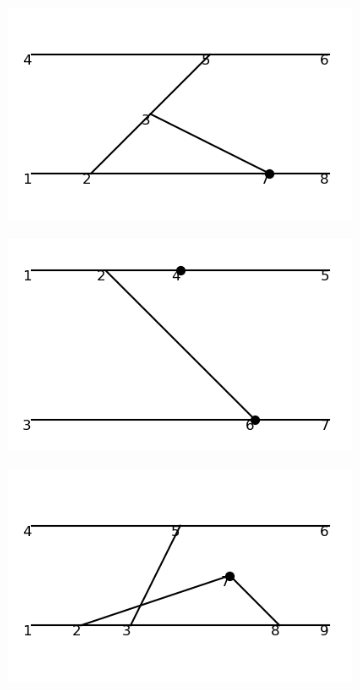 \documentclass[11pt,a4paper,twoside,pdf]{article}
\numberwithin{equation}{section}
\begin{document}
\begin{figure}[h!]
    \begin{subfigure}[t]{0.16\textwidth}
        \centering
        \includegraphics[width=\textwidth]{plots/order6_2to2/counterterms/1.png}
    \end{subfigure}%
    \hfill
    \begin{subfigure}[t]{0.16\textwidth}
        \centering
        \includegraphics[width=\textwidth]{plots/order6_2to2/counterterms/2.png}
    \end{subfigure}
    \hfill
    \begin{subfigure}[t]{0.16\textwidth}
        \centering
        \includegraphics[width=\textwidth]{plots/order6_2to2/counterterms/3.png}

\end{subfigure}
\end{figure}
\end{document}
